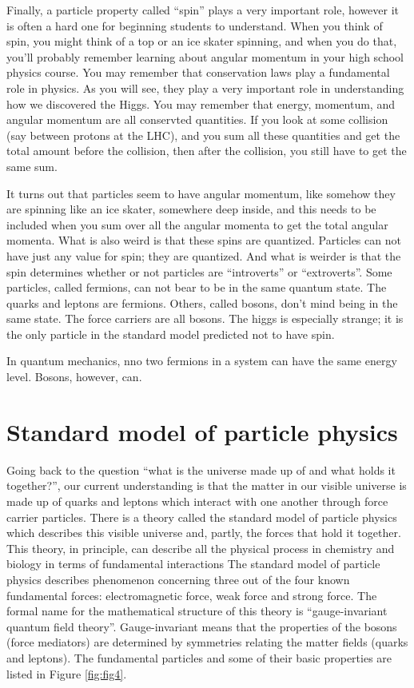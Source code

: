 Finally, a particle property called ``spin'' plays a very important role, however it is often a hard one for beginning students to understand.
When you think of spin, you might think of a top or an ice skater spinning, and when you do that, you'll probably remember learning about angular momentum in your high school physics course.  You may remember that conservation laws play a fundamental role in physics.  As you will see, they play a very important role in understanding how we discovered the Higgs.  You may remember that energy, momentum, and angular momentum are all conservted quantities.  If you look at some collision (say between protons at the LHC), and you sum all these quantities and get the total amount before the collision, then after the collision, you still have to get the same sum.  

It turns out that particles seem to have angular momentum, like somehow they are spinning like an ice skater, somewhere deep inside, and this needs to be included when you sum over all the angular momenta to get the total angular momenta.  What is also weird is that these spins are quantized.  Particles can not have just any value for spin; they are quantized.  And what is weirder is that the spin determines whether or not particles are ``introverts'' or ``extroverts''.  Some particles, called fermions, can not bear to be in the same quantum state.  The quarks and leptons are fermions.  Others, called bosons, don't mind being in the same state.  The force carriers are all bosons.  The higgs is especially strange; it is the only particle in the standard model predicted not to have spin.


In quantum mechanics, nno two fermions in a system can have the same energy level.  Bosons, however, can.


\section{Standard model of particle physics}
Going back to the question ``what is the universe made up of and what holds it together?'', 
our current understanding is that the matter in our visible universe is made up of quarks and leptons which interact with one another through force carrier particles.  There is a theory called the standard model of particle physics which describes this visible universe and, partly, the forces that hold it together. This theory, in principle, can describe all the physical process in chemistry and biology in terms of fundamental interactions The standard model of particle physics describes phenomenon concerning three out of the four known 
fundamental forces: electromagnetic force, weak force and strong force. The formal name for the mathematical structure of this theory is “gauge-invariant quantum field theory”.  Gauge-invariant means that the properties of the bosons (force mediators) are determined by symmetries relating the matter fields (quarks and leptons). 
The fundamental particles and some of their basic properties are listed in 
Figure \ref{fig:fig4}.




